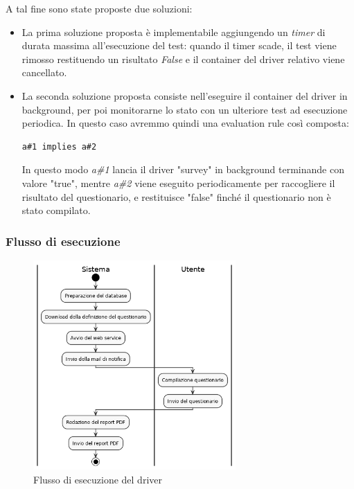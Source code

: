 \documentclass[../main.tex]{subfiles}
\begin{document}
A tal fine sono state proposte due soluzioni:
\begin{itemize}
    \item La prima soluzione proposta è implementabile aggiungendo un \textit{timer} di durata massima all'esecuzione del test: quando il timer scade, il test viene rimosso restituendo un risultato \textit{False} e il container del driver relativo viene cancellato.
\item La seconda soluzione proposta consiste nell'eseguire il container del driver in background, per poi monitorarne lo stato con un ulteriore test ad esecuzione periodica. 
In questo caso avremmo quindi una evaluation rule così composta:
\begin{Verbatim}[frame=single]
a#1 implies a#2
\end{Verbatim}
In questo modo \textit{a\#1} lancia il driver "survey" in background terminande con valore "true", mentre \textit{a\#2} viene eseguito periodicamente per raccogliere il risultato del questionario, e restituisce "false" finché il questionario non è stato compilato.
\end{itemize}
\subsubsection{Flusso di esecuzione}
\begin{figure}[H]
\centering
\includegraphics[height=8cm]{immagini/DRIVER_SURVEY.png}
\caption{Flusso di esecuzione del driver}\label{fig:flussodriver2}

\end{figure}
\end{document}
